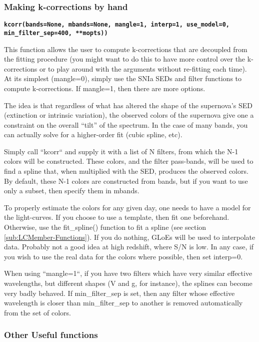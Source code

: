 \subsubsection{Making k-corrections by hand\label{sub:kcorr}}

\texttt{\textbf{kcorr(bands=None, mbands=None, mangle=1, interp=1,
use_model=0, min_filter_sep=400, {*}{*}mopts))}}

This function allows the user to compute k-corrections that are decoupled
from the fitting procedure (you might want to do this to have more
control over the k-corrections or to play around with the arguments
without re-fitting each time). At its simplest (mangle=0), simply
use the SNIa SEDs and filter functions to compute k-corrections. If
mangle=1, then there are more options.

The idea is that regardless of what has altered the shape of the supernova's
SED (extinction or intrinsic variation), the observed colors of the
supernova give one a constraint on the overall ``tilt'' of the spectrum.
In the case of many bands, you can actually solve for a higher-order
fit (cubic spline, etc). 

Simply call ``kcorr`` and supply it with a list of N filters,
from which the N-1 colors will be constructed. These colors, and the
filter pass-bands, will be used to find a spline that, when multiplied
with the SED, produces the observed colors. By default, these N-1
colors are constructed from bands, but if you want to use only a subset,
then specify them in mbands.

To properly estimate the colors for any given day, one needs to have
a model for the light-curves. If you choose to use a template, then
fit one beforehand. Otherwise, use the fit_spline() function to fit
a spline (see section \ref{sub:LCMember-Functions}). If you do nothing,
GLoEs will be used to interpolate data. Probably not a good idea at
high redshift, where S/N is low. In any case, if you wish to use the
real data for the colors where possible, then set interp=0.

When using ``mangle=1``, if you have two filters which have very
similar effective wavelengths, but different shapes (V and g, for
instance), the splines can become very badly behaved. If min_filter_sep
is set, then any filter whose effective wavelength is closer than
min_filter_sep to another is removed automatically from the set
of colors.


\subsubsection{Other Useful functions\label{sub:Other-Useful-functions}}

